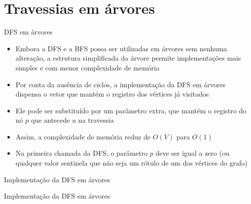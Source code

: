 \section{Travessias em árvores}

\begin{frame}[fragile]{DFS em árvores}

    \begin{itemize}
        \item Embora a DFS e a BFS possa ser utilizadas em árvores sem nenhuma alteração,
            a estrutura simplificada da árvore permite implementações mais simples e com
            menor complexidade de memória
            
        \item Por conta da ausência de ciclos, a implementação da DFS em árvores dispensa o
            vetor que mantém o registro dos vértices já visitados

        \item Ele pode ser substituído por um parâmetro extra, que mantém o registro do nó $p$ que
            antecede $u$ na travessia

        \item Assim, a complexidade de memória reduz de $O(V)$ para $O(1)$

        \item Na primeira chamada da DFS, o parâmetro $p$ deve ser igual a zero (ou qualquer
            valor sentinela que não seja um rótulo de um dos vértices do grafo)
    \end{itemize}

\end{frame}

\begin{frame}[fragile]{Implementação da DFS em árvores}
\end{frame}

\begin{frame}[fragile]{Implementação da DFS em árvores}
\end{frame}

